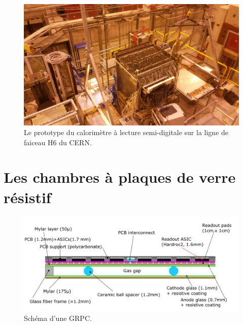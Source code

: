 \begin{figure}[!h]
  \begin{center}
    \includegraphics[width=.8\textwidth]{SDHCAL/figs/proto.jpg}
    \caption{Le prototype du calorimètre à lecture semi-digitale sur la ligne de faiceau H6 du CERN.}
    \label{fig:proto}
  \end{center}
\end{figure}


\section{Les chambres à plaques de verre résistif}

\begin{figure}[!h]
  \begin{center}
    \includegraphics[width=.8\textwidth]{SDHCAL/figs/GRPC-K7.png}
    \caption{Schéma d'une GRPC.}
    \label{fig:grpc}
  \end{center}
\end{figure}

